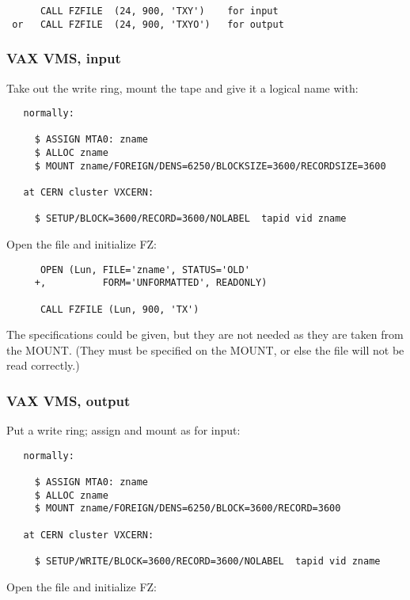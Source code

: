 \begin{verbatim}
      CALL FZFILE  (24, 900, 'TXY')    for input
 or   CALL FZFILE  (24, 900, 'TXYO')   for output
\end{verbatim}

\subsubsection*{VAX VMS, input}

Take out the write ring, mount the tape and give it a logical name with:

\begin{verbatim}
   normally:

     $ ASSIGN MTA0: zname
     $ ALLOC zname
     $ MOUNT zname/FOREIGN/DENS=6250/BLOCKSIZE=3600/RECORDSIZE=3600

   at CERN cluster VXCERN:

     $ SETUP/BLOCK=3600/RECORD=3600/NOLABEL  tapid vid zname
\end{verbatim}

Open the file and initialize FZ:

\begin{verbatim}
      OPEN (Lun, FILE='zname', STATUS='OLD'
     +,          FORM='UNFORMATTED', READONLY)

      CALL FZFILE (Lun, 900, 'TX')
\end{verbatim}

The specifications  
could be given,
but they are not needed as they are taken from the MOUNT.
(They must be specified on the MOUNT,
or else the file will not be read correctly.)

\subsubsection*{VAX VMS, output}

Put a write ring; assign and mount as for input:

\begin{verbatim}
   normally:

     $ ASSIGN MTA0: zname
     $ ALLOC zname
     $ MOUNT zname/FOREIGN/DENS=6250/BLOCK=3600/RECORD=3600

   at CERN cluster VXCERN:

     $ SETUP/WRITE/BLOCK=3600/RECORD=3600/NOLABEL  tapid vid zname
\end{verbatim}

Open the file and initialize FZ:

